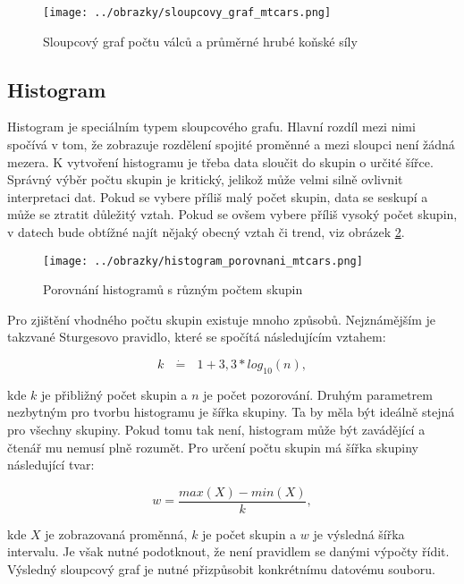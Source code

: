 \begin{figure}[H]
    \centering
    \texttt{[image: ../obrazky/sloupcovy\_graf\_mtcars.png]}
    \caption{Sloupcový graf počtu válců a průměrné hrubé koňské síly} 
    \label{fig:sloupcovy_graf_mtcars}
\end{figure}

\subsection{Histogram}

Histogram je speciálním typem sloupcového grafu. Hlavní rozdíl mezi nimi spočívá v tom, že zobrazuje rozdělení spojité proměnné a mezi sloupci není žádná mezera.
K vytvoření histogramu je třeba data sloučit do skupin o určité šířce. Správný výběr počtu skupin je kritický, jelikož může velmi silně ovlivnit interpretaci dat. Pokud
se vybere příliš malý počet skupin, data se seskupí a může se ztratit důležitý vztah. Pokud se ovšem vybere příliš vysoký počet skupin, v datech bude obtížné najít nějaký
obecný vztah či trend, viz obrázek \ref{fig:histogram_porovnani_mtcars}.

\begin{figure}[H]
    \centering
    \texttt{[image: ../obrazky/histogram\_porovnani\_mtcars.png]}
    \caption{Porovnání histogramů s různým počtem skupin} 
    \label{fig:histogram_porovnani_mtcars}
\end{figure}

Pro zjištění vhodného počtu skupin existuje mnoho způsobů. Nejznámějším je takzvané Sturgesovo pravidlo, které se spočítá následujícím vztahem:

\begin{equation}
    \label{eq:sturgesovo_pravidlo}
    k \text{ } \dot{\mathbf{=}} \text{ } 1 + 3,3 * log_{10}(n),
\end{equation}

kde $k$ je přibližný počet skupin a $n$ je počet pozorování. Druhým parametrem nezbytným pro tvorbu histogramu je šířka skupiny.
Ta by měla být ideálně stejná pro všechny skupiny. Pokud tomu tak není, histogram může být zavádějící a čtenář mu nemusí plně rozumět.
Pro určení počtu skupin má šířka skupiny následující tvar:

\begin{equation}
    w = \frac{max(X) - min(X)}{k},
\end{equation}

kde $X$ je zobrazovaná proměnná, $k$ je počet skupin a $w$ je výsledná šířka intervalu. 
Je však nutné podotknout, že není pravidlem se danými výpočty řídit. Výsledný
sloupcový graf je nutné přizpůsobit konkrétnímu datovému souboru.

